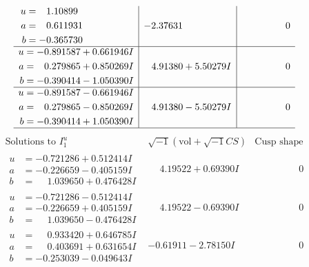\documentclass[1p]{elsarticle_modified}
\theoremstyle{definition}
\newcommand{\I}{\sqrt{-1}}
\begin{document}
$$\begin{array}{c|c|c}
\begin{aligned}
u &= \phantom{-}1.10899\phantom{ +0.000000I} \\
a &= \phantom{-}0.611931\phantom{ +0.000000I} \\
b &= -0.365730\phantom{ +0.000000I}\end{aligned}
 & -2.37631\phantom{ +0.000000I} & \phantom{-0.000000 } 0 \\ \hline\begin{aligned}
u &= -0.891587 + 0.661946 I \\
a &= \phantom{-}0.279865 + 0.850269 I \\
b &= -0.390414 - 1.050390 I\end{aligned}
 & \phantom{-}4.91380 + 5.50279 I & \phantom{-0.000000 } 0 \\ \hline\begin{aligned}
u &= -0.891587 - 0.661946 I \\
a &= \phantom{-}0.279865 - 0.850269 I \\
b &= -0.390414 + 1.050390 I\end{aligned}
 & \phantom{-}4.91380 - 5.50279 I & \phantom{-0.000000 } 0\\
 \hline 
 \end{array}$$\newpage$$\begin{array}{c|c|c}  
\text{Solutions to }I^u_{1}& \I (\text{vol} + \sqrt{-1}CS) & \text{Cusp shape}\\
 \hline 
\begin{aligned}
u &= -0.721286 + 0.512414 I \\
a &= -0.226659 - 0.405159 I \\
b &= \phantom{-}1.039650 + 0.476428 I\end{aligned}
 & \phantom{-}4.19522 + 0.69390 I & \phantom{-0.000000 } 0 \\ \hline\begin{aligned}
u &= -0.721286 - 0.512414 I \\
a &= -0.226659 + 0.405159 I \\
b &= \phantom{-}1.039650 - 0.476428 I\end{aligned}
 & \phantom{-}4.19522 - 0.69390 I & \phantom{-0.000000 } 0 \\ \hline\begin{aligned}
u &= \phantom{-}0.933420 + 0.646785 I \\
a &= \phantom{-}0.403691 + 0.631654 I \\
b &= -0.253039 - 0.049643 I\end{aligned}
 & -0.61911 - 2.78150 I & \phantom{-0.000000 } 0 \\ \hline\begin{aligned}

\end{aligned}
\end{array}$$
\end{document}
